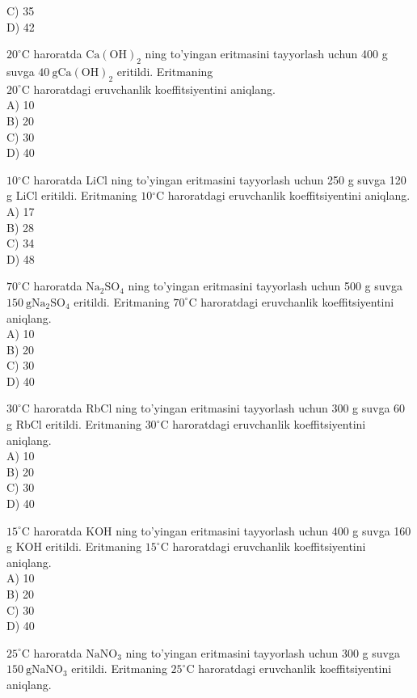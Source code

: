 C) 35\\
D) 42
  \item $20^{\circ} \mathrm{C}$ haroratda $\mathrm{Ca}(\mathrm{OH})_{2}$ ning to'yingan eritmasini tayyorlash uchun 400 g suvga $40 \mathrm{~g} \mathrm{Ca}(\mathrm{OH})_{2}$ eritildi. Eritmaning\\
$20^{\circ} \mathrm{C}$ haroratdagi eruvchanlik koeffitsiyentini aniqlang.\\
A) 10\\
B) 20\\
C) 30\\
D) 40
  \item $10{ }^{\circ} \mathrm{C}$ haroratda LiCl ning to'yingan eritmasini tayyorlash uchun 250 g suvga 120 g LiCl eritildi. Eritmaning $10{ }^{\circ} \mathrm{C}$ haroratdagi eruvchanlik koeffitsiyentini aniqlang.\\
A) 17\\
B) 28\\
C) 34\\
D) 48
  \item $70^{\circ} \mathrm{C}$ haroratda $\mathrm{Na}_{2} \mathrm{SO}_{4}$ ning to'yingan eritmasini tayyorlash uchun 500 g suvga $150 \mathrm{~g} \mathrm{Na}_{2} \mathrm{SO}_{4}$ eritildi. Eritmaning $70^{\circ} \mathrm{C}$ haroratdagi eruvchanlik koeffitsiyentini aniqlang.\\
A) 10\\
B) 20\\
C) 30\\
D) 40
  \item $30^{\circ} \mathrm{C}$ haroratda RbCl ning to'yingan eritmasini tayyorlash uchun 300 g suvga 60 g RbCl eritildi. Eritmaning $30^{\circ} \mathrm{C}$ haroratdagi eruvchanlik koeffitsiyentini aniqlang.\\
A) 10\\
B) 20\\
C) 30\\
D) 40
  \item $15^{\circ} \mathrm{C}$ haroratda KOH ning to'yingan eritmasini tayyorlash uchun 400 g suvga 160 g KOH eritildi. Eritmaning $15^{\circ} \mathrm{C}$ haroratdagi eruvchanlik koeffitsiyentini aniqlang.\\
A) 10\\
B) 20\\
C) 30\\
D) 40
  \item $25^{\circ} \mathrm{C}$ haroratda $\mathrm{NaNO}_{3}$ ning to'yingan eritmasini tayyorlash uchun 300 g suvga $150 \mathrm{~g} \mathrm{NaNO}_{3}$ eritildi. Eritmaning $25^{\circ} \mathrm{C}$ haroratdagi eruvchanlik koeffitsiyentini aniqlang.\\
